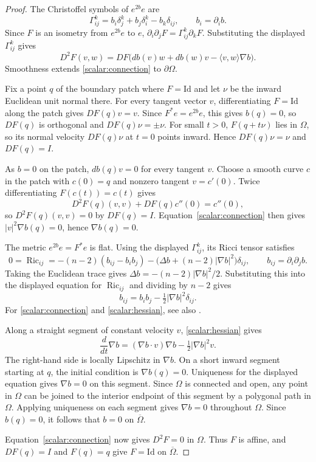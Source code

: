 \documentclass[11pt,a4paper]{article}
\theoremstyle{definition}
\theoremstyle{remark}
\newcommand{\Id}{\mathrm{Id}}
\numberwithin{equation}{section}
\begin{document}
\begin{proof}
The Christoffel symbols of $e^{2b}e$ are
\[
 \Gamma^k_{ij}=b_i\delta^k_j+b_j\delta^k_i-b_k\delta_{ij},
 \qquad b_i=\partial_i b.
\]
Since $F$ is an isometry from $e^{2b}e$ to $e$,
$\partial_i\partial_jF=\Gamma^k_{ij}\partial_kF$. Substituting
the displayed $\Gamma^k_{ij}$ gives
\begin{equation}\label{scalar:connection}
 D^2F(v,w)
 =DF\bigl(db(v)w+db(w)v-\langle v,w\rangle\nabla b\bigr).
\end{equation}
Smoothness extends \eqref{scalar:connection} to $\partial\Omega$.

Fix a point $q$ of the boundary patch where $F=\Id$ and let $\nu$
be the inward Euclidean unit normal there. For every tangent vector
$v$, differentiating $F=\Id$ along the patch gives $DF(q)v=v$.
Since $F^*e=e^{2b}e$, this gives $b(q)=0$, so $DF(q)$ is orthogonal
and $DF(q)\nu=\pm\nu$. For small $t>0$, $F(q+t\nu)$ lies in $\Omega$,
so its normal velocity $DF(q)\nu$ at $t=0$ points inward.
Hence $DF(q)\nu=\nu$ and $DF(q)=I$.

As $b=0$ on the patch, $db(q)v=0$ for every tangent $v$.
Choose a smooth curve $c$ in the patch with $c(0)=q$ and nonzero
tangent $v=c'(0)$. Twice differentiating $F(c(t))=c(t)$ gives
\[
 D^2F(q)(v,v)+DF(q)c''(0)=c''(0),
\]
so $D^2F(q)(v,v)=0$ by $DF(q)=I$. Equation~\eqref{scalar:connection}
then gives $|v|^2\nabla b(q)=0$, hence $\nabla b(q)=0$.

The metric $e^{2b}e=F^*e$ is flat. Using the displayed
$\Gamma^k_{ij}$, its Ricci tensor satisfies
\[
 0=\operatorname{Ric}_{ij}
 =-(n-2)(b_{ij}-b_i b_j)
   -\bigl(\Delta b+(n-2)|\nabla b|^2\bigr)\delta_{ij},
 \qquad b_{ij}=\partial_i\partial_j b.
\]
Taking the Euclidean trace gives
$\Delta b=-(n-2)|\nabla b|^2/2$. Substituting this into the displayed
equation for $\operatorname{Ric}_{ij}$ and dividing by $n-2$ gives
\begin{equation}\label{scalar:hessian}
 b_{ij}=b_i b_j-\tfrac12|\nabla b|^2\delta_{ij}.
\end{equation}
For \eqref{scalar:connection} and \eqref{scalar:hessian}, see also
\citet[Equations~(4)--(6)]{KushelmanMcGrath2024}.

Along a straight segment of constant velocity $v$,
\eqref{scalar:hessian} gives
\[
 \frac{d}{dt}\nabla b=(\nabla b\cdot v)\nabla b-\tfrac12|\nabla b|^2v.
\]
The right-hand side is locally Lipschitz in $\nabla b$. On a short
inward segment starting at $q$, the initial condition is $\nabla b(q)=0$.
Uniqueness for the displayed equation gives $\nabla b=0$ on this
segment. Since $\Omega$ is connected and open, any point in
$\Omega$ can be joined to the interior endpoint of this segment by
a polygonal path in $\Omega$. Applying uniqueness on each segment
gives $\nabla b=0$ throughout $\Omega$. Since $b(q)=0$, it follows
that $b=0$ on $\overline\Omega$.

Equation~\eqref{scalar:connection} now gives $D^2F=0$ in $\Omega$.
Thus $F$ is affine, and $DF(q)=I$ and $F(q)=q$ give
$F=\Id$ on $\overline\Omega$.
\end{proof}
\end{document}
